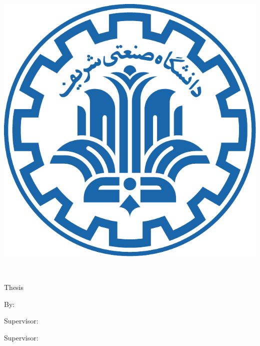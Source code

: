 

\begin{center}

\begin{latin}

\includegraphics[scale=0.25]{front/template/images/logo}

\EnglishThesisUniversity \\
\EnglishThesisDepartment

\begin{large}
\vspace{0.7cm}
\EnglishThesisDegree{} Thesis


\vspace{1.5cm}

{\Large\textbf\EnglishThesisTitle}

\vspace{1.5cm}

{\normalsize By:}\\
\textbf{\EnglishThesisAuthor}

\vspace{1cm}

{\normalsize Supervisor:}\\ 
\textbf{\EnglishThesisSupervisor}

\vspace{1cm}

{\normalsize Supervisor:}\\ 
\textbf{\EnglishSecondSupervisor}

\end{large}

\vspace{1.5cm}
\EnglishThesisDate

\end{latin}

\end{center}
